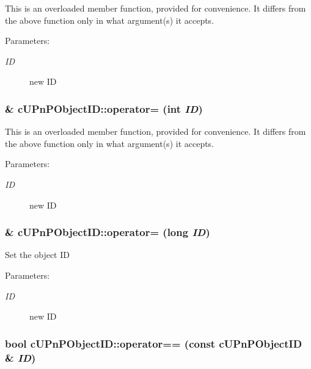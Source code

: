 This is an overloaded member function, provided for convenience. It differs from the above function only in what argument(s) it accepts. \begin{Desc}
\item[Parameters:]
\begin{description}
\item[{\em ID}]new ID \end{description}
\end{Desc}
\hypertarget{structcUPnPObjectID_b83af995ac5e03b6f6402d83a6713960}{
\subsubsection[{operator=}]{\& cUPnPObjectID::operator= (int {\em ID})}}
\label{structcUPnPObjectID_b83af995ac5e03b6f6402d83a6713960}


This is an overloaded member function, provided for convenience. It differs from the above function only in what argument(s) it accepts. \begin{Desc}
\item[Parameters:]
\begin{description}
\item[{\em ID}]new ID \end{description}
\end{Desc}
\hypertarget{structcUPnPObjectID_747dfcfad52baae471cc756bed63a6e8}{
\subsubsection[{operator=}]{\& cUPnPObjectID::operator= (long {\em ID})}}
\label{structcUPnPObjectID_747dfcfad52baae471cc756bed63a6e8}


Set the object ID \begin{Desc}
\item[Parameters:]
\begin{description}
\item[{\em ID}]new ID \end{description}
\end{Desc}
\hypertarget{structcUPnPObjectID_54cb3e4ab1b340c9580e915dbf9319a1}{
\subsubsection[{operator==}]{\setlength{\rightskip}{0pt plus 5cm}bool cUPnPObjectID::operator== (const {\bf cUPnPObjectID} \& {\em ID})}}
\label{structcUPnPObjectID_54cb3e4ab1b340c9580e915dbf9319a1}


